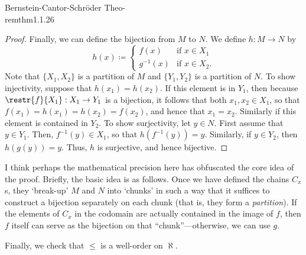 \begin{thm}{Bernstein-Cantor-Schröder Theo-\\rem}{thm1.1.26}
\begin{proof}
		Finally, we can define the bijection from $M$ to $N$.  We define $h \colon M\rightarrow N$ by
		\begin{equation}
		h(x)\coloneqq \begin{cases}f(x) & \text{if }x\in X_1 \\ g^{-1}(x) & \text{if }x\in X_2.\end{cases}
		\end{equation}
		Note that $\{ X_1,X_2\}$ is a partition of $M$ and $\{ Y_1,Y_2\}$ is a partition of $N$.  To show injectivity, suppose that $h(x_1)=h(x_2)$.  If this element is in $Y_1$, then because $\restr{f}{X_1}:X_1\rightarrow Y_1$ is a bijection, it follows that both $x_1,x_2\in X_1$, so that $f(x_1)=h(x_1)=h(x_2)=f(x_2)$, and hence that $x_1=x_2$.  Similarly if this element is contained in $Y_2$.  To show surjectivity, let $y\in N$.  First assume that $y\in Y_1$.  Then, $f^{-1}(y)\in X_1$, so that $h\left( f^{-1}(y)\right) =y$.  Similarly, if $y\in Y_2$, then $h\left( g(y)\right) =y$.  Thus, $h$ is surjective, and hence bijective.
	\end{proof}
	\begin{rmk}
		I think perhaps the mathematical precision here has obfuscated the core idea of the proof.  Briefly, the basic idea is as follows.  Once we have defined the chains $C_x$s, they `break-up' $M$ and $N$ into `chunks' in such a way that it suffices to construct a bijection separately on each chunk (that is, they form a \emph{partition}).  If the elements of $C_x$ in the codomain are actually contained in the image of $f$, then $f$ itself can serve as the bijection on that ``chunk''---otherwise, we can use $g$.
	\end{rmk}
\end{thm}
Finally, we check that $\leq$ is a well-order on $\aleph$.
